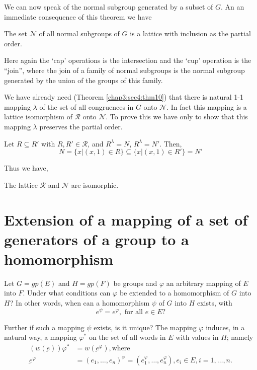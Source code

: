 We can now speak of the normal subgroup generated by a subset of
$G$. An an immediate consequence of this theorem we have 
 
\begin{theorem}\label{chap3:sec7:thm18} %
  The set $\mathscr{N}$ of all normal subgroups of $G$ is a lattice
  with inclusion as the partial order. 
\end{theorem}

Here again the `cap' operations is the intersection and the `cup'
operation is the ``join'', where the join of a family of normal
subgroups is the normal subgroup generated by the union of the groups
of this family. 

We have already need (Theorem \ref{chap3:sec4:thm10}) that there is
natural 1-1 mapping 
$\lambda$ of the set of all congruences in $G$ onto $\mathscr{N}$. In\pageoriginale
fact this mapping is a lattice isomorphism of $\mathscr{R}$ onto
$\mathscr{N}$. To prove this we have only to show that this mapping
$\lambda$ preserves the partial order. 
 
 Let $R \subseteq R'$ with $R, R' \in  \mathscr{R}$, and
 $R^\lambda =N$, $R^\lambda = N'$. Then,  
 $$
 N= \bigg\{ x \big | (x,1) \in  R \bigg\} \subseteq \bigg\{ x
 \big| (x,1) \in  R'\bigg\} = N' 
 $$
 
Thus we have,
\begin{theorem}\label{chap3:sec7:thm19} %
  The lattice $\mathscr{R}$ and $\mathscr{N}$ are isomorphic.
\end{theorem} 
 
 \section[Extension of a mapping of a set of...]{Extension of a mapping of a set of generators of a group to
   a homomorphism}\label{chap3:sec8} %
 
 Let $G=gp(E)$ and $H = gp (F)$ be groups and $\varphi$ an arbitrary
 mapping of $E$ into $F$. Under what conditions can $\varphi$ be
 extended to a homomorphism of $G$ into $H$? In other words, when can
 a homomorphism $\psi$ of $G$ into $H$ exists, with   
 $$
 e^\psi = e^\varphi,  \text{ for all } e \in  E ?
 $$
 
 Further if such a mapping $\psi$ exists, is it unique? The mapping
 $\varphi$ induces, in a natural way, a mapping $\varphi^*$ on the set
 of all words in $E$ with values in $H$; namely 
\begin{align*}
   (w (\underbar{e})) \varphi^* &= w (\underbar{e}^\varphi), \text{
     where }\\ 
   \underbar{e}^\varphi &= (e_1, \ldots, e_n)^\varphi = (e_1^\varphi, 
   \ldots, e_n^\varphi), e_i \in  E, i= 1, \ldots,  n. 
\end{align*} 

